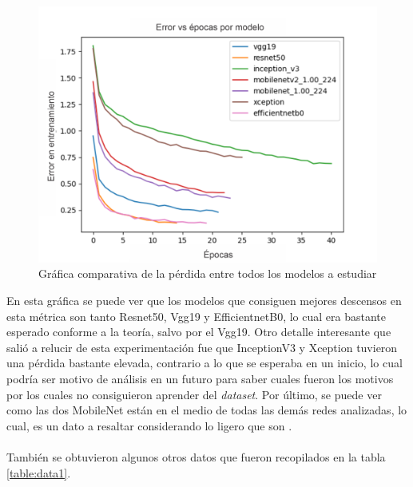 \begin{figure}[h!]
\includegraphics[width=1\textwidth]{images/loss1.png}
\centering
\caption{Gráfica comparativa de la pérdida entre todos los modelos a estudiar}
\label{fig:losses1}
\end{figure}


En esta gráfica se puede ver que los modelos que consiguen mejores descensos en esta métrica son tanto Resnet50, Vgg19 y EfficientnetB0, lo cual era bastante esperado conforme a la teoría, salvo por el Vgg19. Otro detalle interesante que salió a relucir de esta experimentación fue que InceptionV3 y Xception tuvieron una pérdida bastante elevada, contrario a lo que se esperaba en un inicio, lo cual podría ser motivo de análisis en un futuro para saber cuales fueron los motivos por los cuales no consiguieron aprender del \textit{dataset}. Por último, se puede ver como las dos MobileNet están en el medio de todas las demás redes analizadas, lo cual, es un dato a resaltar considerando lo ligero que son . \\\\
También se obtuvieron algunos otros datos que fueron recopilados en la tabla \ref{table:data1}.

